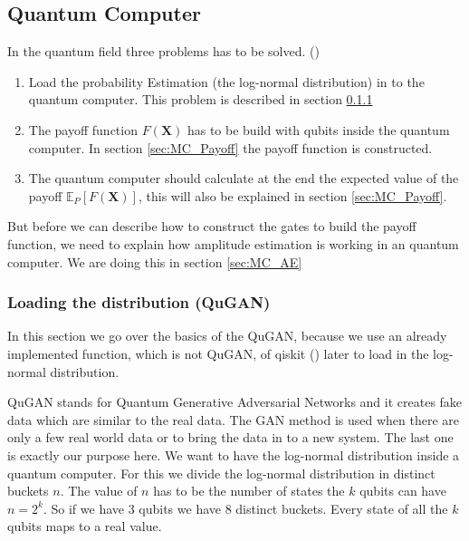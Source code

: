 \documentclass[a4paper, 12pt, one column, aas_macros]{article}
\begin{document}
\subsection{Quantum Computer}\label{sec:MC_quanten}
In the quantum field three problems has to be solved. (\cite{1905.02666})
\begin{enumerate}
	\item Load the probability Estimation (the log-normal distribution) in to the quantum computer. This problem is described in section \ref{sec:MC_QGAN}
	\item The payoff function $F(\textbf{X})$ has to be build with qubits inside the quantum computer. In section \ref{sec:MC_Payoff} the payoff function is constructed.
	\item The quantum computer should calculate at the end the expected value of the payoff $\mathbb{E}_P[F(\textbf{X})]$, this will also be explained in section \ref{sec:MC_Payoff}.
\end{enumerate}
But before we can describe how to construct the gates to build the payoff function, we need to explain how amplitude estimation is working in an quantum computer. We are doing this in section \ref{sec:MC_AE}

\subsubsection{Loading the distribution (QuGAN)}\label{sec:MC_QGAN}
In this section we go over the basics of the QuGAN, because we use an already implemented function, which is not QuGAN, of qiskit (\cite{Qiskit}) later to load in the log-normal distribution.

QuGAN stands for Quantum Generative Adversarial Networks and it creates fake data which are similar to the real data. The GAN method is used when there are only a few real world data or to bring the data in to a new system. The last one is exactly our purpose here. We want to have the log-normal distribution inside a quantum computer. For this we divide the log-normal distribution in distinct buckets $n$. The value of $n$ has to be the number of states the $k$ qubits can have $n=2^{k}$. So if we have 3 qubits we have 8 distinct buckets. Every state of all the $k$ qubits maps to a real value.
\end{document}
